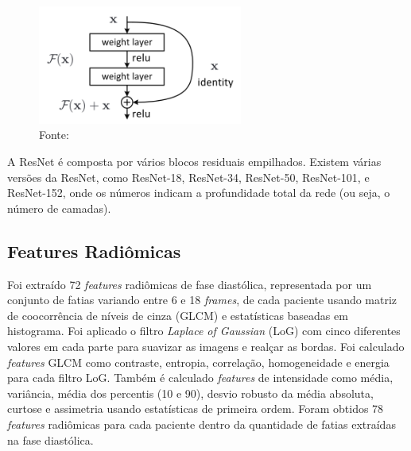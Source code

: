 \begin{figure}[htbp]
    \centering
    \includegraphics[width=0.6\textwidth]{figures/fig013.png}
    \caption{Fonte: \cite{aiSelfAttentionBasedFusion2023}}
    \label{fig:fig013}
\end{figure}

A ResNet é composta por vários blocos residuais empilhados.
Existem várias versões da ResNet, como ResNet-18, ResNet-34, ResNet-50, ResNet-101, e ResNet-152, onde os números indicam a profundidade total da rede (ou seja, o número de camadas).

\subsection{Features Radiômicas}
\label{subsec:cap4_features_radiomicas}

Foi extraído 72 \textit{features} radiômicas de fase diastólica, representada por um conjunto de fatias variando entre 6 e 18 \textit{frames}, de cada paciente usando matriz de coocorrência de níveis de cinza (GLCM) e estatísticas baseadas em histograma. Foi aplicado o filtro \textit{Laplace of Gaussian} (LoG) com cinco diferentes valores em cada parte para suavizar as imagens e realçar as bordas. Foi calculado \textit{features} GLCM como contraste, entropia, correlação, homogeneidade e energia para cada filtro LoG. Também é calculado \textit{features} de intensidade como média, variância, média dos percentis (10 e 90), desvio robusto da média absoluta, curtose e assimetria usando estatísticas de primeira ordem. Foram obtidos 78 \textit{features} radiômicas para cada paciente dentro da quantidade de fatias extraídas na fase diastólica.

